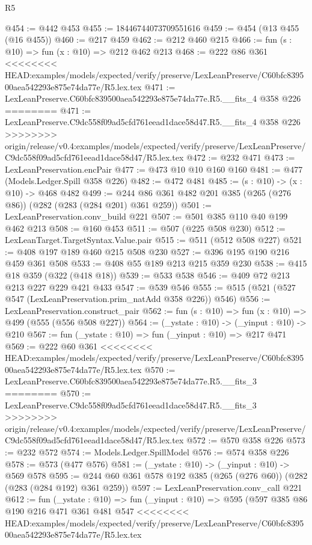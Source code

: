 \begin{lexlean}{R5}
\begin{coremodule}
{{{{{{{{{{{{{@454 := @442 @453
@455 := 18446744073709551616
@459 := @454 (@13 @455 (@16 @455))
@460 := @217 @459
@462 := @212 @460 @215
@466 := fun (s : @10) => fun (x : @10) => @212 @462 @213
@468 := @222 @86 @361
<<<<<<<< HEAD:examples/models/expected/verify/preserve/LexLeanPreserve/C60bfc839500aea542293e875e74da77e/R5.lex.tex
@471 := LexLeanPreserve.C60bfc839500aea542293e875e74da77e.R5.__fits_4 @358 @226
========
@471 := LexLeanPreserve.C9dc558f09ad5cfd761eead1dace58d47.R5.__fits_4 @358 @226
>>>>>>>> origin/release/v0.4:examples/models/expected/verify/preserve/LexLeanPreserve/C9dc558f09ad5cfd761eead1dace58d47/R5.lex.tex
@472 := @232 @471
@473 := LexLeanPreservation.encPair
@477 := @473 @10 @10 @160 @160
@481 := @477 (Models.Ledger.Spill @358 @226)
@482 := @472 @481
@485 := (s : @10) -> (x : @10) -> @468 @482
@499 := @244 @86 @361 @482 @201 @385 (@265 (@276 @86)) (@282 (@283 (@284 @201) @361 @259))
@501 := LexLeanPreservation.conv_build @221
@507 := @501 @385 @110 @40 @199 @462 @213
@508 := @160 @453
@511 := @507 (@225 @508 @230)
@512 := LexLeanTarget.TargetSyntax.Value.pair
@515 := @511 (@512 @508 @227)
@521 := @408 @197 @189 @460 @215 @508 @230
@527 := @396 @195 @190 @216 @459 @361 @508
@533 := @408 @55 @189 @213 @215 @359 @230
@538 := @415 @18 @359 (@322 (@418 @18))
@539 := @533 @538
@546 := @409 @72 @213 @213 @227 @229 @421 @433
@547 := @539 @546
@555 := @515 (@521 (@527 @547 (LexLeanPreservation.prim_natAdd @358 @226)) @546)
@556 := LexLeanPreservation.construct_pair
@562 := fun (s : @10) => fun (x : @10) => @499 (@555 (@556 @508 @227))
@564 := (_ystate : @10) -> (_yinput : @10) -> @210
@567 := fun (_ystate : @10) => fun (_yinput : @10) => @217 @471
@569 := @222 @60 @361
<<<<<<<< HEAD:examples/models/expected/verify/preserve/LexLeanPreserve/C60bfc839500aea542293e875e74da77e/R5.lex.tex
@570 := LexLeanPreserve.C60bfc839500aea542293e875e74da77e.R5.__fits_3
========
@570 := LexLeanPreserve.C9dc558f09ad5cfd761eead1dace58d47.R5.__fits_3
>>>>>>>> origin/release/v0.4:examples/models/expected/verify/preserve/LexLeanPreserve/C9dc558f09ad5cfd761eead1dace58d47/R5.lex.tex
@572 := @570 @358 @226
@573 := @232 @572
@574 := Models.Ledger.SpillModel
@576 := @574 @358 @226
@578 := @573 (@477 @576)
@581 := (_ystate : @10) -> (_yinput : @10) -> @569 @578
@595 := @244 @60 @361 @578 @192 @385 (@265 (@276 @60)) (@282 (@283 (@284 @192) @361 @259))
@597 := LexLeanPreservation.conv_call @221
@612 := fun (_ystate : @10) =>
  fun (_yinput : @10) =>
  @595
    (@597
      @385
      @86
      @190
      @216
      @471
      @361
      @481
      @547
<<<<<<<< HEAD:examples/models/expected/verify/preserve/LexLeanPreserve/C60bfc839500aea542293e875e74da77e/R5.lex.tex
}}}}}}}}}}}}}
\end{coremodule}
\end{lexlean}
